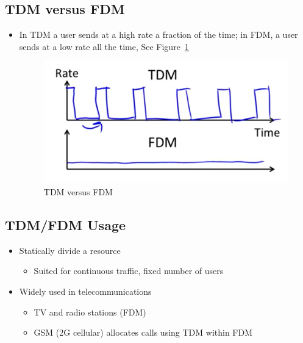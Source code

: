 \documentclass[12pt]{ctexart}   %
\begin{document}
	\subsection{TDM versus FDM}
	\begin{itemize}
		\item In TDM a user sends at a high rate a fraction of the time; in FDM, a user sends at a low rate all the time, See Figure~\ref{fig:3-3-3}
		
		\begin{figure}[h!] %
		\centering
		 \includegraphics[scale=0.7]{images/3-3-3}
		\caption{TDM versus FDM}
		 \label{fig:3-3-3}
		 \end{figure}
	\end{itemize}
	
	\subsection{TDM/FDM Usage}
	\begin{itemize}
		\item Statically divide a resource
		\begin{itemize}
			\item Suited for continuous traffic, fixed number of users
		\end{itemize}
		
		\item Widely used in telecommunications
		\begin{itemize}
			\item TV and radio stations (FDM)
			\item GSM (2G cellular) allocates calls using TDM within FDM
		\end{itemize}
	\end{itemize}
	
\end{document}

